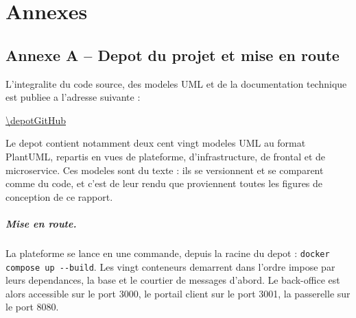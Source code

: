 \cleardoublepage
{}
{}
\chapter*{Annexes}

\newcommand{\serieAnnexe}[1]{%
  \setcounter{figure}{0}\setcounter{table}{0}%
  \renewcommand{\thefigure}{#1.\arabic{figure}}%
  \renewcommand{\thetable}{#1.\arabic{table}}%
}
\serieAnnexe{A}

\section*{Annexe A -- Depot du projet et mise en route}

L'integralite du code source, des modeles UML et de la documentation
technique est publiee a l'adresse suivante :

\begin{center}
\url{\depotGitHub}
\end{center}

Le depot contient notamment deux cent vingt modeles UML au format
PlantUML, repartis en vues de plateforme, d'infrastructure, de frontal et
de microservice. Ces modeles sont du texte : ils se versionnent et se
comparent comme du code, et c'est de leur rendu que proviennent toutes
les figures de conception de ce rapport.

\paragraph{Mise en route.}
La plateforme se lance en une commande, depuis la racine du depot :
\texttt{docker compose up -{}-build}. Les vingt conteneurs demarrent dans
l'ordre impose par leurs dependances, la base et le courtier de messages
d'abord. Le back-office est alors accessible sur le port 3000, le portail
client sur le port 3001, la passerelle sur le port 8080.

